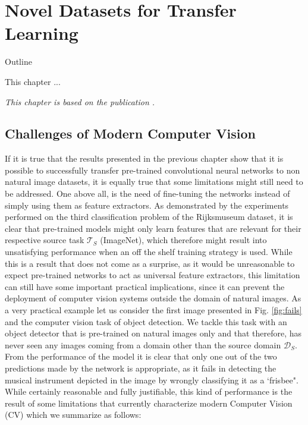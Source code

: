 \chapter{Novel Datasets for Transfer Learning}

\begin{remark}{Outline}

This chapter ...

\vspace{5mm}
\textit{This chapter is based on the publication \citet{sabatelli2021advances}.}
\label{ch:minerva_paper}


\end{remark}


\section{Challenges of Modern Computer Vision}
\label{sec:cv_challenges}

If it is true that the results presented in the previous chapter show that it is possible to successfully transfer pre-trained convolutional neural networks to non natural image datasets, it is equally true that some limitations might still need to be addressed. One above all, is the need of fine-tuning the networks instead of simply using them as feature extractors. As demonstrated by the experiments performed on the third classification problem of the Rijksmuseum dataset, it is clear that pre-trained models might only learn features that are relevant for their respective source task $\mathcal{T}_S$ (ImageNet), which therefore might result into unsatisfying performance when an off the shelf training strategy is used. While this is a result that does not come as a surprise, as it would be unreasonable to expect pre-trained networks to act as universal feature extractors, this limitation can still have some important practical implications, since it can prevent the deployment of computer vision systems outside the domain of natural images. As a very practical example let us consider the first image presented in Fig. \ref{fig:fails} and the computer vision task of object detection. We tackle this task with an object detector that is pre-trained on natural images only and that therefore, has never seen any images coming from a domain other than the source domain $\mathcal{D}_S$. From the performance of the model it is clear that only one out of the two predictions made by the network is appropriate, as it fails in detecting the musical instrument depicted in the image by wrongly classifying it as a `frisbee". While certainly reasonable and fully justifiable, this kind of performance is the result of some limitations that currently characterize modern Computer Vision (CV) which we summarize as follows:

